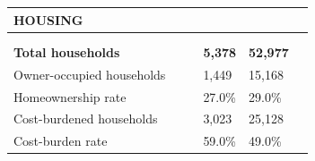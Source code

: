 \documentclass[9pt]{report}
\begin{document}
\vspace{12pt}
\setlength{\tabcolsep}{.01in} %
\begin{tabular}{p{.10in}p{.10in}p{.10in}p{3.7in}>{\hfill}p{.85in}>{\hfill}p{.85in}>{\hfill}p{.85in}>{\hfill}p{.85in}p{0.1in}}
\multicolumn{9}{l}{\parbox{7.1in}{\raggedright{\large{\strut\textbf{HOUSING}\strut}}}} \\ 
\hline
\multicolumn{4}{l}{\parbox{3.5in}{\raggedright{\textbf{}}}} & \multicolumn{1}{r}{\parbox{.85in}{\strut\raggedleft{\textbf{}\strut}}} & \multicolumn{1}{r}{\parbox{.85in}{\strut\raggedleft{\textbf{}\strut}}} & \multicolumn{1}{r}{\parbox{.85in}{\strut{}}} & \multicolumn{1}{r}{\parbox{.85in}{\strut{}}} & \\ 
\multicolumn{9}{l}{} \\ 
\multicolumn{4}{l}{\parbox{3.5in}{\strut\raggedright{\textbf{Total households}\strut}}} & \textbf{} & \textbf{} & \textbf{5,378} & \textbf{52,977} & \textbf{} \\ 
\multicolumn{4}{l}{\parbox{3.6in}{\strut\raggedright{{Owner-occupied households}}\strut}} &  &  & 1,449 & 15,168 & \multicolumn{1}{l}{}  \\ 
\multicolumn{4}{l}{\parbox{3.6in}{\strut\raggedright{{Homeownership rate}}\strut}} &  &  & 27.0\% & 29.0\% & \multicolumn{1}{l}{}  \\ 
\multicolumn{4}{l}{\parbox{3.6in}{\strut\raggedright{{Cost-burdened households}}\strut}} &  &  & 3,023 & 25,128 & \multicolumn{1}{l}{}  \\ 
\multicolumn{4}{l}{\parbox{3.6in}{\strut\raggedright{{Cost-burden rate}}\strut}} &  &  & 59.0\% & 49.0\% & \multicolumn{1}{l}{}  \\ 

\end{tabular}
\setlength{\tabcolsep}{6pt} %
\end{document}
